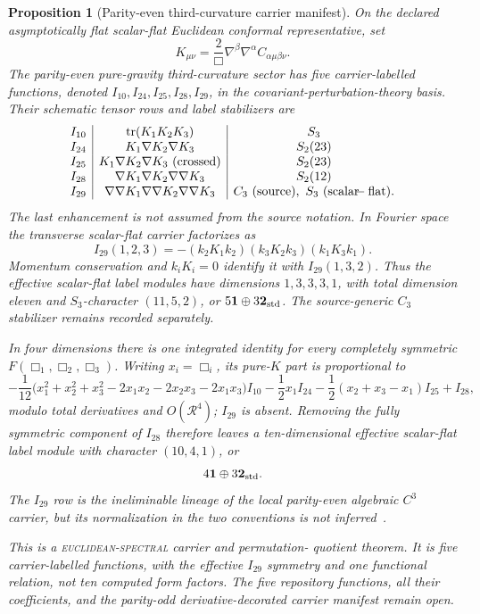 \documentclass[11pt]{article}
\newtheorem{proposition}[theorem]{Proposition}
\theoremstyle{definition}
\theoremstyle{remark}
\begin{document}
\begin{proposition}[Parity-even third-curvature carrier manifest]
On the declared asymptotically flat scalar-flat Euclidean conformal
representative, set
\[
 K_{\mu\nu}=\frac{2}{\Box}\nabla^\beta\nabla^\alpha
 C_{\alpha\mu\beta\nu}.
\]
The parity-even pure-gravity third-curvature sector has five
carrier-labelled functions, denoted
$I_{10},I_{24},I_{25},I_{28},I_{29}$,
in the covariant-perturbation-theory basis.  Their schematic tensor rows and
label stabilizers are
\[
\begin{array}{c|c|c}
 I_{10}&\operatorname{tr}(K_1K_2K_3)&S_3\\
 I_{24}&K_1\nabla K_2\nabla K_3&S_2(23)\\
 I_{25}&K_1\nabla K_2\nabla K_3\ \text{(crossed)}&S_2(23)\\
 I_{28}&\nabla K_1\nabla K_2\nabla\nabla K_3&S_2(12)\\
 I_{29}&\nabla\nabla K_1\nabla\nabla K_2\nabla\nabla K_3&C_3\ {\rm(source)},\ S_3\ {\rm(scalar\!\!\!-flat)}.
\end{array}
\]
The last enhancement is not assumed from the source notation.  In Fourier
space the transverse scalar-flat carrier factorizes as
\[
 I_{29}(1,2,3)=-(k_2K_1k_2)(k_3K_2k_3)(k_1K_3k_1).
\]
Momentum conservation and $k_iK_i=0$ identify it with
$I_{29}(1,3,2)$.  Thus the effective scalar-flat label modules have
dimensions $1,3,3,3,1$, with total dimension eleven and $S_3$-character
$(11,5,2)$, or $5\mathbf1\oplus3\mathbf2_{\rm std}$.  The source-generic
$C_3$ stabilizer remains recorded separately.

In four dimensions there is one integrated identity for every completely
symmetric $F(\Box_1,\Box_2,\Box_3)$.  Writing $x_i=\Box_i$, its pure-$K$
part is proportional to
\[
 -\frac1{12}\bigl(x_1^2+x_2^2+x_3^2
 -2x_1x_2-2x_2x_3-2x_1x_3\bigr)I_{10}
 -\frac12x_1I_{24}
 -\frac12(x_2+x_3-x_1)I_{25}+I_{28},
\]
modulo total derivatives and $O(\mathcal R^4)$; $I_{29}$ is absent.
Removing the fully symmetric component of $I_{28}$ therefore leaves a
ten-dimensional effective scalar-flat label module with character $(10,4,1)$, or
\[
 4\mathbf1\oplus3\mathbf2_{\rm std}.
\]
The $I_{29}$ row is the ineliminable lineage of the local parity-even
algebraic $C^3$ carrier, but its normalization in the two conventions is
not inferred~\cite{BarvinskyCPT,BarvinskyConformalDecomposition}.

This is a \textnormal{\textsc{euclidean-spectral}} carrier and permutation-
quotient theorem.  It is five carrier-labelled functions, with the effective
$I_{29}$ symmetry and one functional relation, not ten computed form factors.  The five repository
functions, all their coefficients, and the parity-odd derivative-decorated
carrier manifest remain open.
\end{proposition}
\end{document}
